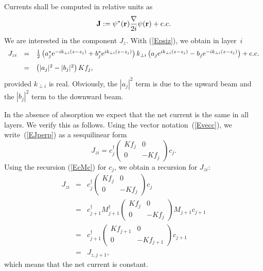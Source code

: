 Currents shall be computed in relative units as
\begin{equation}
  \mathbf{J}:=\psi^*(\mathbf{r})\frac{\mathbf{\nabla}}{2i}\psi(\mathbf{r})+\text{c.c.}
\end{equation}
We are interested in the component $J_z$.
With (\ref{Epsiz}),
we obtain in layer~$i$
\begin{equation}\label{EJperp}
  \begin{array}{lcl}
  J_{zi} &=& \frac{1}{2}
  \left( a_j^*\text{e}^{-ik_{\perp i}(z-z_j)} + b_j^*\text{e}^{ik_{\perp i}(z-z_j)} \right)
  k_{\perp i}
  \left( a_j\text{e}^{ik_{\perp i}(z-z_j)} - b_j\text{e}^{-ik_{\perp i}(z-z_j)} \right)
  +\text{c.c.}\\[2ex]
  &=& \left( |a_j|^2 - |b_j|^2 \right) K f_j,
  \end{array}
\end{equation}
provided $k_{\perp i}$ is real.
Obviously,
the $|a_j|^2$ term is due to the upward beam
and the $|b_j|^2$ term to the downward beam.

In the absence of absorption we expect that the net current
is the same in all layers.
We verify this as follows.
Using the vector notation~(\ref{Evecc}),
we write~(\ref{EJperp}) as a sesquilinear form
\begin{equation}
  J_{zi}
  = c_j^\dagger \left(\begin{array}{cc}Kf_j&0\\0&-Kf_j\end{array}\right) c_j.
\end{equation}
Using the recursion (\ref{EcMc}) for $c_j$,
we obtain a recursion for $J_{zi}$:
\begin{equation}\label{EJrec}
  \begin{array}{lcl}
    J_{zi} &=&
    c_j^\dagger
    \left(\begin{array}{cc}Kf_j&0\\0&-Kf_j\end{array}\right) c_j
    \\[3ex]
    &=&
    c_{j+1}^\dagger M_{j+1}^\dagger
    \left(\begin{array}{cc}Kf_j&0\\0&-Kf_j\end{array}\right)
    M_{j+1}c_{j+1}
    \\[3ex]
    &=&
    c_{j+1}^\dagger
    \left(\begin{array}{cc}Kf_{j+1}&0\\0&-Kf_{j+1}\end{array}\right)
    c_{j+1}
    \\[3ex]
    &=&
    J_{z,j+1},
  \end{array}
\end{equation}
which means that the net current is constant.


